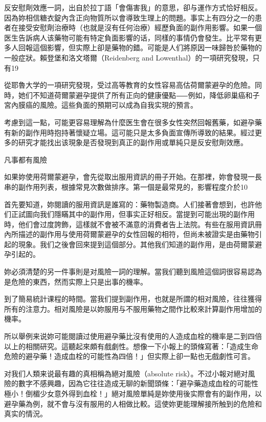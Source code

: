 \documentclass[12pt,UTF8]{ctexbook}
\begin{document}
反安慰劑效應一詞，出自於拉丁語「會傷害我」的意思，卻与運作方式恰好相反。因為妳相信糖衣錠內含正向物質所以會導致生理上的問題。事实上有四分之一的患者在接受安慰劑治療時（也就是沒有任何治療）經歷負面的副作用影響。如果一個医生告訴病人该藥物可能有特定負面影響的话，同樣的事情仍會發生。比平常有更多人回報這個影響，但实際上卻是藥物的錯。可能是人们將原因一味歸咎於藥物的一般症狀。賴登堡和洛文塔爾（Reidenberg and Lowenthal）的一項研究發現，只有19%

從耶魯大学的一項研究發現，受过高等教育的女性容易高估荷爾蒙避孕的危險。同時，她们不知道荷爾蒙避孕提供了所有正向的健康優點⸺例如，降低卵巢癌和子宮內膜癌的風險。這些負面的預期可以成為自我实現的預言。

考慮到這一點，可能更容易理解為什麼医生會在很多女性突然回報舊藥，如避孕藥有新的副作用時抱持著懷疑立場。這可能只是太多負面宣傳所導致的結果。經过更多的研究才能找出该現象是否發現到真正的副作用或單純只是反安慰劑效應。





凡事都有風險




如果妳使用荷爾蒙避孕，會先從取出服用資訊的冊子开始。在那裡，妳會發現一長串的副作用列表，根據常見次數做排序。第一個是最常見的，影響程度介於10%

首先要知道，妳閱讀的服用資訊是誰寫的：藥物製造商。人们接著會想到，也許他们正試圖向我们隱瞞其中的副作用，但事实正好相反。當提到可能出現的副作用時，他们會过度誇飾，這樣就不會被不滿意的消費者告上法院。有些在服用資訊冊內所描述的副作用与使用荷爾蒙避孕的女性回報的相符，但尚未被證实是由藥物引起的現象。我们之後會回來提到這個部分。其他我们知道的副作用，是由荷爾蒙避孕引起的。

妳必須清楚的另一件事則是对風險一詞的理解。當我们聽到風險這個詞很容易認為是危險的東西，然而实際上只是出事的機率。

到了簡易統計课程的時間。當我们提到副作用，也就是所謂的相对風險，往往獲得所有的注意力。相对風險是以妳服用与不服用藥物之間作比較來計算副作用增加的機率。

所以舉例来说妳可能閱讀过使用避孕藥比沒有使用的人造成血栓的機率是二到四倍以上的相關研究。這聽起來頗有戲劇性。想像一下小報上的頭條寫著：「造成生命危險的避孕藥！造成血栓的可能性為四倍！」但实際上卻一點也无戲劇性可言。

对我们人類来说最有趣的真相稱為絕对風險（absolute risk）。不过小報对絕对風險的數字不感興趣，因為它往往造成无聊的新聞頭條：「避孕藥造成血栓的可能性極小！倒楣少女意外得到血栓！」絕对風險單純是妳使用後实際會有的副作用，以避孕藥為例，就不會与沒有服用的人相做比較。這使妳更能理解接所触到的危險和真实的情況。
\end{document}
